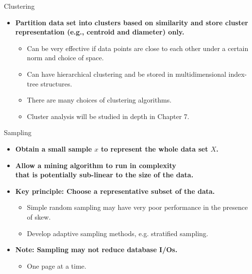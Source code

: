 \documentclass[aspectratio=169,t]{beamer}
\begin{document}
  { 
    \begin{frame}{Clustering}
    \begin{itemize}
      \item \textbf{Partition data set into clusters based on similarity and store cluster representation (e.g., centroid and diameter) only.}
      \begin{itemize}
        \item Can be very effective if data points are close to each other under a certain norm and choice of space.
        \item Can have hierarchical clustering and be stored in multidimensional index-tree structures.
        \item There are many choices of clustering algorithms.
        \item Cluster analysis will be studied in depth in Chapter 7.
      \end{itemize}
    \end{itemize}
    \end{frame}
  }

  { 
    \begin{frame}{Sampling}
    \begin{itemize}
      \item \textbf{Obtain a small sample $x$ to represent the whole data set $X$.}
      \item \textbf{Allow a mining algorithm to run in complexity \\ that is potentially sub-linear to the size of the data.}
      \item \textbf{Key principle: Choose a {\color{airforceblue}representative} subset of the data.}
      \begin{itemize}
        \item Simple random sampling may have very poor performance in the presence of skew.
        \item Develop adaptive sampling methods, e.g. stratified sampling.
      \end{itemize}
      \item \textbf{Note: Sampling may not reduce database I/Os.}
      \begin{itemize}
        \item One page at a time.
      \end{itemize}
    \end{itemize}
    \end{frame}
  }
\end{document}
